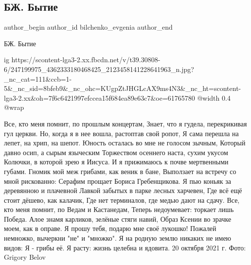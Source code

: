  
 
 
 
 
 
\subsection{БЖ. Бытие}
\label{sec:20_10_2021.fb.bilchenko_evgenia.6.bytie}
 
\ifcmt
 author_begin
   author_id bilchenko_evgenia
 author_end
\fi

БЖ. Бытие

\ifcmt
  ig https://scontent-lga3-2.xx.fbcdn.net/v/t39.30808-6/247199975_4362333180468425_2123458141228641963_n.jpg?_nc_cat=111&ccb=1-5&_nc_sid=8bfeb9&_nc_ohc=KUgpZtJHGLcAX9ms4N3&_nc_ht=scontent-lga3-2.xx&oh=7f6c6421997efccea15f684ea89e63c7&oe=61765780
  @width 0.4
  @wrap 
\fi

Все, кто меня помнит, по прошлым концертам,
Знает, что я гудела, перекрикивая гул церкви.
Но, когда я в нее вошла, растоптав свой ропот,
Я сама перешла на лепет, на хрип, на шепот.
Юность осталась во мне не голосом зычным,
Который давно осип, а сырым языческим
Торжеством осеннего наста, сухим укусом
Колючки, в которой зрею я Иисуса.
И я прижимаюсь к почве мертвенными губами.
Гномик мой меж грибами, как веник в бане,
Выползает на встречу со мной рискованно:
Серафим прощает Бориса Гребенщикова.
Я пью коньяк за деревянною и плачевной
Лавкой забытых в парке лесных харчевен,
Где всё ещё стоит дёшево, как калачик,
Где нет терминалов, где медью дают на сдачу.
Все, кто меня помнит, по Ведам и Кастанедам,
Теперь недоумевает: торкает лишь Победа.
Алое знамя карликов, зелёные стяги навий,
Образ Ксении во зрачке моем, как в оправе.
Я прошу тебя, подарю мне своё лукошко!
Пожалей немножко, вычеркни "не" и "множко".
Я на родную землю никаких не имею видов:
Я - грибы её. Я расту: жизнь целебна и ядовита.
20 октября 2021 г.
Фото: Grigory Belov
